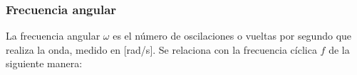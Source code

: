 \documentclass{article}
\begin{document}

    \subsubsection{Frecuencia angular}

    La frecuencia angular $\omega$ es el número de oscilaciones o vueltas por segundo que realiza la onda, medido en [rad/s]. Se relaciona con la frecuencia cíclica $f$ de la siguiente manera:
\end{document}
